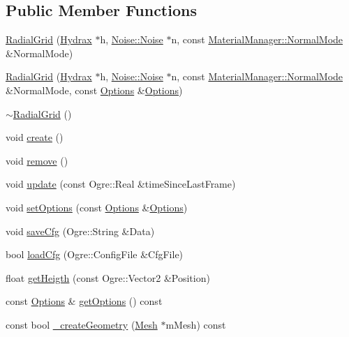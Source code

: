 \subsection*{Public Member Functions}
\begin{CompactItemize}
\item 
\hyperlink{class_hydrax_1_1_module_1_1_radial_grid_5633f577c51302d5175f4feddfa80d19}{RadialGrid} (\hyperlink{class_hydrax_1_1_hydrax}{Hydrax} $\ast$h, \hyperlink{class_hydrax_1_1_noise_1_1_noise}{Noise::Noise} $\ast$n, const \hyperlink{class_hydrax_1_1_material_manager_aa14689cd1c259f48954dfecda9b296f}{MaterialManager::NormalMode} \&NormalMode)
\item 
\hyperlink{class_hydrax_1_1_module_1_1_radial_grid_bc52ff8727a537d5303fabc1179fa45f}{RadialGrid} (\hyperlink{class_hydrax_1_1_hydrax}{Hydrax} $\ast$h, \hyperlink{class_hydrax_1_1_noise_1_1_noise}{Noise::Noise} $\ast$n, const \hyperlink{class_hydrax_1_1_material_manager_aa14689cd1c259f48954dfecda9b296f}{MaterialManager::NormalMode} \&NormalMode, const \hyperlink{struct_hydrax_1_1_module_1_1_radial_grid_1_1_options}{Options} \&\hyperlink{struct_hydrax_1_1_module_1_1_radial_grid_1_1_options}{Options})
\item 
\hyperlink{class_hydrax_1_1_module_1_1_radial_grid_f8caf3997cfc178019db4ac735394b7c}{$\sim$RadialGrid} ()
\item 
void \hyperlink{class_hydrax_1_1_module_1_1_radial_grid_8c0f059e53170e7d1114bb7faecbcb0a}{create} ()
\item 
void \hyperlink{class_hydrax_1_1_module_1_1_radial_grid_5b595aede4b235740be75fb5cf1072cf}{remove} ()
\item 
void \hyperlink{class_hydrax_1_1_module_1_1_radial_grid_ee5199bfbee4429ab428d477e36443dd}{update} (const Ogre::Real \&timeSinceLastFrame)
\item 
void \hyperlink{class_hydrax_1_1_module_1_1_radial_grid_cfc2ae157df9b6159302a90561ffc038}{setOptions} (const \hyperlink{struct_hydrax_1_1_module_1_1_radial_grid_1_1_options}{Options} \&\hyperlink{struct_hydrax_1_1_module_1_1_radial_grid_1_1_options}{Options})
\item 
void \hyperlink{class_hydrax_1_1_module_1_1_radial_grid_241237552e8f36f7e4696b8bad7acc91}{saveCfg} (Ogre::String \&Data)
\item 
bool \hyperlink{class_hydrax_1_1_module_1_1_radial_grid_31b3bab8e74f2f1e316a1800470ac685}{loadCfg} (Ogre::ConfigFile \&CfgFile)
\item 
float \hyperlink{class_hydrax_1_1_module_1_1_radial_grid_0289caac51efbaf6a085bbb94eb22c4c}{getHeigth} (const Ogre::Vector2 \&Position)
\item 
const \hyperlink{struct_hydrax_1_1_module_1_1_radial_grid_1_1_options}{Options} \& \hyperlink{class_hydrax_1_1_module_1_1_radial_grid_cf6dab9b665fcf36467219bcabc5aa14}{getOptions} () const 
\item 
const bool \hyperlink{class_hydrax_1_1_module_1_1_radial_grid_8fde866e72e871e7aaf76957236b7b15}{\_\-createGeometry} (\hyperlink{class_hydrax_1_1_mesh}{Mesh} $\ast$mMesh) const 
\end{CompactItemize}


